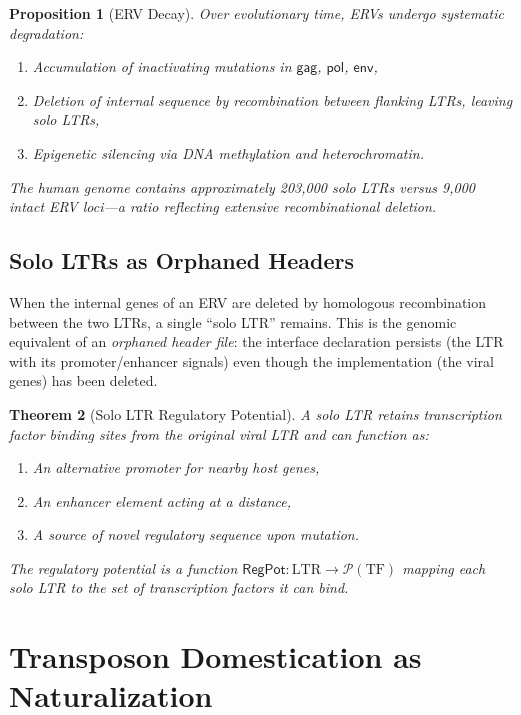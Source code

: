 \documentclass[12pt,a4paper]{article}
\newtheorem{theorem}{Theorem}[section]
\newtheorem{proposition}[theorem]{Proposition}
\begin{document}
\begin{proposition}[ERV Decay]\label{prop:erv-decay}
Over evolutionary time, ERVs undergo systematic degradation:
\begin{enumerate}[label=(\roman*)]
  \item Accumulation of inactivating mutations in $\mathsf{gag}$, $\mathsf{pol}$, $\mathsf{env}$,
  \item Deletion of internal sequence by recombination between flanking LTRs, leaving
    solo LTRs,
  \item Epigenetic silencing via DNA methylation and heterochromatin.
\end{enumerate}
The human genome contains approximately 203{,}000 solo LTRs versus 9{,}000 intact ERV
loci---a ratio reflecting extensive recombinational deletion.
\end{proposition}

\subsection{Solo LTRs as Orphaned Headers}

When the internal genes of an ERV are deleted by homologous recombination between the
two LTRs, a single ``solo LTR'' remains. This is the genomic equivalent of an
\emph{orphaned header file}: the interface declaration persists (the LTR with its
promoter/enhancer signals) even though the implementation (the viral genes) has been
deleted.

\begin{theorem}[Solo LTR Regulatory Potential]\label{thm:solo-ltr}
A solo LTR retains transcription factor binding sites from the original viral LTR and
can function as:
\begin{enumerate}[label=(\roman*)]
  \item An alternative promoter for nearby host genes,
  \item An enhancer element acting at a distance,
  \item A source of novel regulatory sequence upon mutation.
\end{enumerate}
The regulatory potential is a function $\mathsf{RegPot} : \mathrm{LTR} \to \mathcal{P}(\mathrm{TF})$
mapping each solo LTR to the set of transcription factors it can bind.
\end{theorem}


\section{Transposon Domestication as Naturalization}\label{sec:domestication}
\end{document}

